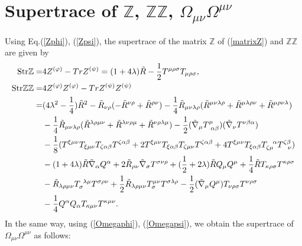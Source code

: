 \section{Supertrace of $\mathbb{Z}$, $\mathbb{Z}\mathbb{Z}$, $\Omega_{\mu\nu}\Omega^{\mu\nu}$}
Using Eq.(\ref{Zphi}), (\ref{Zpsi}), the supertrace of the matrix $\mathbb{Z}$ of (\ref{matrixZ}) and 
$\mathbb{Z}\mathbb{Z}$ are given by 
\begin{align}
{\rm Str} \mathbb{Z} = & 4Z^{(\varphi)}-Tr Z^{(\psi)} = (1+4\lambda)\tilde{R} - \frac{1}{2}T^{\mu\rho\sigma}T_{\mu\rho\sigma}, \\
{\rm Str} \mathbb{Z}\mathbb{Z} = & 4 Z^{(\varphi)}Z^{(\varphi)}-Tr Z^{(\psi)}Z^{(\psi)} \nonumber \\
= & (4\lambda^2-\frac{1}{4})\tilde{R}^2-\tilde{R}_{\nu\rho}(-\tilde{R}^{\nu\rho}+\tilde{R}^{\rho\nu}) 
-\frac{1}{4}\tilde{R}_{\mu\nu\lambda\rho}(
 \tilde{R}^{\mu\nu\lambda\rho}+\tilde{R}^{\mu\lambda\rho\nu}+\tilde{R}^{\mu\rho\nu\lambda}
 ) \nonumber \\
& -\frac{1}{4}\tilde{R}_{\mu\nu\lambda\rho}(
 \tilde{R}^{\lambda\rho\mu\nu}+\tilde{R}^{\lambda\nu\rho\mu}+\tilde{R}^{\nu\rho\lambda\mu}
) 
-\frac{1}{2}(\tilde{\nabla}_\mu T^\mu_{\ \alpha\beta})(\tilde{\nabla}_\nu T^{\nu \beta\alpha}) \nonumber \\
& - \frac{1}{8}(
T^{\xi\mu\nu}T_{\xi\mu\nu}T_{\zeta\alpha\beta}T^{\zeta\alpha\beta}
+2T^{\xi\mu\nu}T_{\xi\alpha\beta}T_{\zeta\mu\nu}T^{\zeta\alpha\beta}
+4T^{\xi\mu\nu}T_{\xi\alpha\beta}T_{\zeta\mu}^{\ \ \alpha}T^{\zeta\beta}_{\ \ \nu}) \nonumber \\
& -(1+4\lambda)\tilde{R}\tilde{\nabla}_\alpha Q^\alpha
+2\tilde{R}_{\rho\nu} \tilde{\nabla}_\sigma T^{\sigma \nu\rho}
+(\frac{1}{2}+2\lambda)\tilde{R}Q_\mu Q^\mu 
+\frac{1}{4}\tilde{R}T_{\kappa\rho\sigma}T^{\kappa\rho\sigma} \nonumber \\
& -\tilde{R}_{\lambda\rho\mu\nu}T_\sigma^{\ \lambda\mu}T^{\sigma\rho\nu} 
 +\frac{1}{2}\tilde{R}_{\lambda\rho\mu\nu}T_\sigma^{\mu\nu}T^{\sigma\lambda\rho} 
 -\frac{1}{2}(\tilde{\nabla}_\mu Q^\mu)T_{\nu\rho\sigma}T^{\nu\rho\sigma} \nonumber \\
& -\frac{1}{4}Q^\alpha Q_\alpha T_{\kappa\mu\nu}T^{\kappa\mu\nu}. \label{StrZZ}
\end{align}
In the same way, using (\ref{Omegaphi}), (\ref{Omegapsi}), we obtain the supertrace of $\Omega_{\mu\nu}\Omega^{\mu\nu}$ as 
follows:
